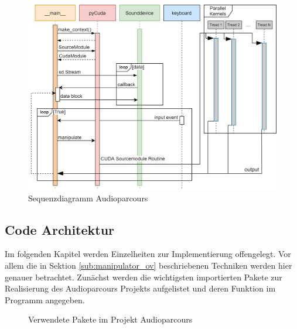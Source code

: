 \begin{figure}[hbt!]
	\centering      
	\includegraphics[scale=0.46, angle=-90]{figures/Soundmanipulator_sequence.png}
	\caption{Sequenzdiagramm Audioparcours}
	\label{fig:Seq_soundManipulator}
\end{figure}
\newpage
\subsection{Code Architektur}

Im folgenden Kapitel werden Einzelheiten zur Implementierung offengelegt. Vor allem die in Sektion \ref{sub:manipulator_ov} beschriebenen Techniken werden hier genauer betrachtet. Zunächst werden die wichtigsten importierten Pakete zur Realisierung des Audioparcours Projekts aufgelistet und deren Funktion im Programm angegeben.

\begin{figure}[h!]
	
	\caption{Verwendete Pakete im Projekt Audioparcours}
	\label{fig:audioparkour_packages}
\end{figure}

